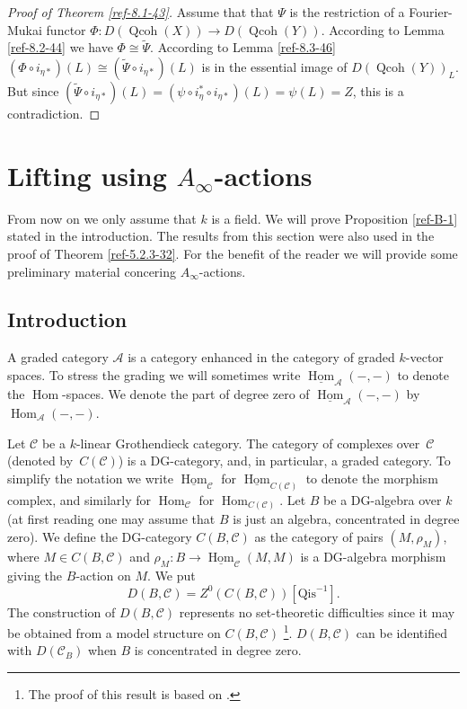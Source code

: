 \documentclass{amsart}
\numberwithin{equation}{section}
\let\cal\mathcal
\theoremstyle{definition}
\theoremstyle{remark}
\begin{document}
\begin{proof}[Proof of Theorem \ref{ref-8.1-43}] Assume that that $\Psi$ is the restriction of a Fourier-Mukai functor $\Phi:D({\operatorname{Qcoh}}(X)){\rightarrow} D({\operatorname{Qcoh}}(Y))$. According to
Lemma \ref{ref-8.2-44} we have $\Phi\cong \widetilde{\Psi}$. According to Lemma \ref{ref-8.3-46} $(\Phi\circ i_{\eta\ast} )(L)\cong (\widetilde{\Psi}\circ i_{\eta\ast})(L)$ is in the essential image
of $D({\operatorname{Qcoh}}(Y))_L$. But since $(\widetilde{\Psi}\circ  i_{\eta\ast})(L)=(\psi \circ i^\ast_\eta\circ i_{\eta\ast})(L)=\psi(L)=Z$, this is a contradiction.
\end{proof}
\section{Lifting using $A_\infty$-actions}
From now on we only assume that $k$ is a field. We will prove Proposition \ref{ref-B-1} stated in the introduction.
The results from this section were also used in the proof of Theorem \ref{ref-5.2.3-32}.
For the benefit of the reader we will provide some preliminary material concering $A_\infty$-actions.
\subsection{Introduction}
A graded category ${{\cal A}}$ is a category enhanced in the category of
graded $k$-vector spaces. To stress the grading we will sometimes write
$\underline{\operatorname {Hom}}_{{\cal A}}(-,-)$ to denote the ${\operatorname {Hom}}$-spaces. We denote
the part of degree zero of $\underline{\operatorname {Hom}}_{{\cal A}}(-,-)$ by ${\operatorname {Hom}}_{{\cal A}}(-,-)$.

Let
${{\cal C}}$ be a $k$-linear Grothendieck category. The category of complexes over~${{\cal C}}$ (denoted by~$C({{\cal C}})$) is
a DG-category, and, in particular, a graded category. To simplify the notation we write $\underline{\operatorname {Hom}}_{{\cal C}}$
for $\underline{\operatorname {Hom}}_{C({{\cal C}})}$ to denote the morphism complex, and similarly for ${\operatorname {Hom}}_{{\cal C}}$ for ${\operatorname {Hom}}_{C({{\cal C}})}$.
Let $B$ be a
DG-algebra over $k$ (at first reading one may assume that $B$ is just
an algebra, concentrated in degree zero). We define the
DG-category $C(B,{{\cal C}})$ as the category of pairs $(M,\rho_M)$, where $M\in C(B,{{\cal C}})$ and $\rho_M:B\to\underline{\operatorname {Hom}}_{{\cal C}}(M,M)$ is a DG-algebra morphism giving the $B$-action on $M$. We put
\[
D(B,{{\cal C}})=Z^0(C(B,{{\cal C}}))[\text{Qis}^{-1}].
\]
The construction of $D(B,{{\cal C}})$ represents no set-theoretic difficulties since
it may be obtained from a model structure on $C(B,{{\cal C}})$ \cite[Prop.\ 5.1]{lowenvdb2}\footnote{The
proof of this result is based on \cite{Beke}.}. $D(B,{{\cal C}})$ can be identified with $D({{\cal C}}_B)$ when $B$ is concentrated in degree zero.
\end{document}
